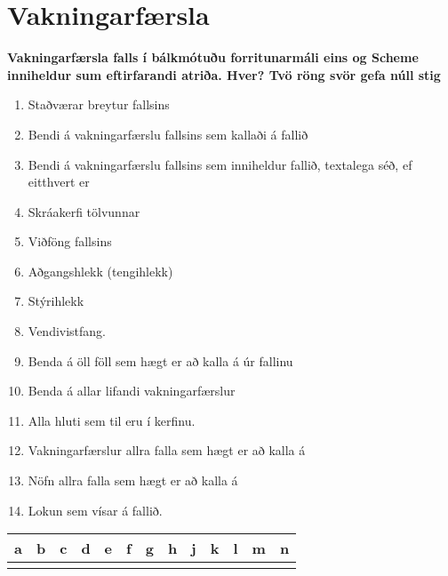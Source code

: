 \documentclass{article}
\newcommand{\bo}[1]{\textbf{#1}}
\newcommand{\enum}{\begin{enumerate}[label = \alph*.]}
\begin{document}
\newpage
\section{Vakningarfærsla}

\bo{Vakningarfærsla falls í bálkmótuðu forritunarmáli eins og Scheme
inniheldur sum eftirfarandi atriða. Hver? Tvö röng svör gefa núll
stig}

\enum
\item Staðværar breytur fallsins
\item Bendi á vakningarfærslu fallsins sem kallaði á fallið
\item Bendi á vakningarfærslu fallsins sem inniheldur fallið, textalega
séð, ef eitthvert er
\item Skráakerfi tölvunnar
\item Viðföng fallsins
\item Aðgangshlekk (tengihlekk)
\item Stýrihlekk
\item Vendivistfang.
\item Benda á öll föll sem hægt er að kalla á úr fallinu
\item Benda á allar lifandi vakningarfærslur
\item Alla hluti sem til eru í kerfinu.
\item Vakningarfærslur allra falla sem hægt er að kalla á
\item Nöfn allra falla sem hægt er að kalla á
\item Lokun sem vísar á fallið.
\end{enumerate}


\begin{tabularx}{\textwidth}{|X|X|X|X|X|X|X|X|X|X|X|X|X|}
    \hline
    \bo{a} & \bo{b} & \bo{c} & \bo{d} & \bo{e} & \bo{f} & \bo{g} & \bo{h} & \bo{j} & \bo{k} & \bo{l} & \bo{m} & \bo{n} \\ \hline
     & & & & & & & & & & & & \\ \hline
\end{tabularx}
\end{document}
